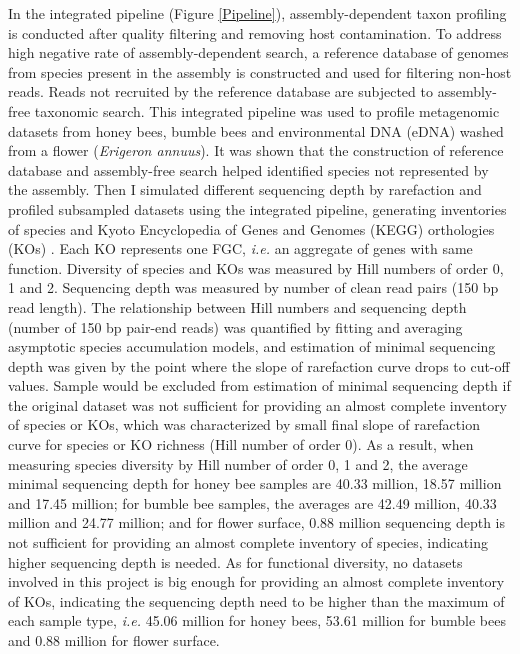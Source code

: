 \documentclass[11pt]{article}
\begin{document}
  In the integrated pipeline (Figure \ref{Pipeline}), assembly-dependent taxon profiling is conducted after quality filtering and removing host contamination. 
  To address high negative rate of assembly-dependent search, a reference database of genomes from species present in the assembly is constructed and used for filtering non-host reads. 
  Reads not recruited by the reference database are subjected to assembly-free taxonomic search. 
  This integrated pipeline was used to profile metagenomic datasets from honey bees, bumble bees and environmental DNA (eDNA) washed from a flower (\textit{Erigeron annuus}). 
  It was shown that the construction of reference database and assembly-free search helped identified species not represented by the assembly. 
  Then I simulated different sequencing depth by rarefaction and profiled subsampled datasets using the integrated pipeline, generating inventories of species and Kyoto Encyclopedia of Genes and Genomes (KEGG) orthologies (KOs) \citep{kanehisa2000kegg}. 
  Each KO represents one FGC, \textit{i.e.} an aggregate of genes with same function. 
  Diversity of species and KOs was measured by Hill numbers of order 0, 1 and 2. 
  Sequencing depth was measured by number of clean read pairs (150 bp read length). 
  The relationship between Hill numbers and sequencing depth (number of 150 bp pair-end reads) was quantified by fitting and averaging asymptotic species accumulation models, and estimation of minimal sequencing depth was given by the point where the slope of rarefaction curve drops to cut-off values. 
  Sample would be excluded from estimation of minimal sequencing depth if the original dataset was not sufficient for providing an almost complete inventory of species or KOs, which was characterized by small final slope of rarefaction curve for species or KO richness (Hill number of order 0). 
  As a result, when measuring species diversity by Hill number of order 0, 1 and 2, the average minimal sequencing depth for honey bee samples are 40.33 million, 18.57 million and 17.45 million; for bumble bee samples, the averages are 42.49 million, 40.33 million and 24.77 million; and for flower surface, 0.88 million sequencing depth is not sufficient for providing an almost complete inventory of species, indicating higher sequencing depth is needed. 
  As for functional diversity, no datasets involved in this project is big enough for providing an almost complete inventory of KOs, indicating the sequencing depth need to be higher than the maximum of each sample type, \textit{i.e.} 45.06 million for honey bees, 53.61 million for bumble bees and 0.88 million for flower surface. 
\end{document}
